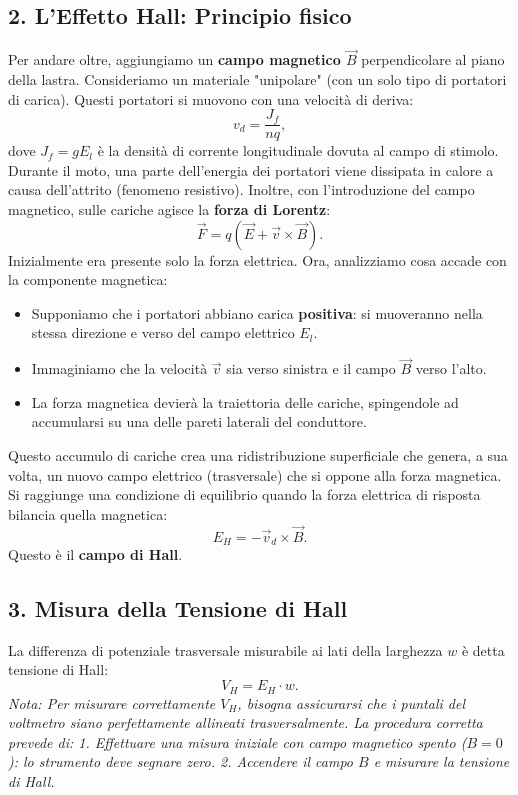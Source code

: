 \documentclass{book}
\begin{document}
\subsection*{2. L'Effetto Hall: Principio fisico}
Per andare oltre, aggiungiamo un \textbf{campo magnetico \(\vec{B}\)} perpendicolare al piano della lastra.
Consideriamo un materiale "unipolare" (con un solo tipo di portatori di carica). Questi portatori si muovono con una velocità di deriva:
\[
v_d = \frac{J_f}{nq},
\]
dove \(J_f = g E_l\) è la densità di corrente longitudinale dovuta al campo di stimolo.
Durante il moto, una parte dell'energia dei portatori viene dissipata in calore a causa dell'attrito (fenomeno resistivo). Inoltre, con l'introduzione del campo magnetico, sulle cariche agisce la \textbf{forza di Lorentz}:
\[
\vec{F} = q(\vec{E} + \vec{v} \times \vec{B}).
\]
Inizialmente era presente solo la forza elettrica. Ora, analizziamo cosa accade con la componente magnetica:
\begin{itemize}
    \item Supponiamo che i portatori abbiano carica \textbf{positiva}: si muoveranno nella stessa direzione e verso del campo elettrico \(E_l\).
    \item Immaginiamo che la velocità \(\vec{v}\) sia verso sinistra e il campo \(\vec{B}\) verso l'alto.
    \item La forza magnetica devierà la traiettoria delle cariche, spingendole ad accumularsi su una delle pareti laterali del conduttore.
\end{itemize}
Questo accumulo di cariche crea una ridistribuzione superficiale che genera, a sua volta, un nuovo campo elettrico (trasversale) che si oppone alla forza magnetica. Si raggiunge una condizione di equilibrio quando la forza elettrica di risposta bilancia quella magnetica:
\[
E_H = -\vec{v}_d \times \vec{B}.
\]
Questo è il \textbf{campo di Hall}.

\subsection*{3. Misura della Tensione di Hall}
La differenza di potenziale trasversale misurabile ai lati della larghezza \(w\) è detta tensione di Hall:
\[
V_H = E_H \cdot w.
\]
\emph{Nota: Per misurare correttamente \(V_H\), bisogna assicurarsi che i puntali del voltmetro siano perfettamente allineati trasversalmente. La procedura corretta prevede di:
1. Effettuare una misura iniziale con campo magnetico spento (\(B=0\)): lo strumento deve segnare zero.
2. Accendere il campo \(B\) e misurare la tensione di Hall.}
\end{document}
